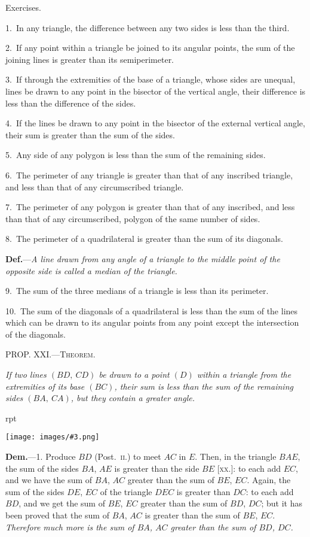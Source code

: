 \documentclass[oneside]{book}
\newcounter{wrapwidth}
\newcommand\mypropl[2]{
\bigskip\Needspace*{4\baselineskip}\begin{center}\textsc{#1}\end{center}
\hspace{\parindent}\emph{#2}\par\medskip
}
\newcommand\exhead[1]{
\Needspace*{5\baselineskip}\begin{center}
\textsf{#1}
\end{center}
}
\newcommand\imgflow[3]{
\setcounter{wrapwidth}{#1}
\begin{wrapfigure}[#2]{r}{\value{wrapwidth}pt}
\begin{center}
\vspace{-0.3in}
\texttt{[image: images/\#3.png]}
\end{center}
\end{wrapfigure}
}
\begin{document}
\exhead{Exercises.}

\begin{footnotesize}
1.~In any triangle, the difference between any two sides is less
than the third.

2.~If any point within a triangle be joined to its angular points,
the sum of the joining lines is greater than its semiperimeter.

3.~If through the extremities of the base of a triangle, whose
sides are unequal, lines be drawn to any point in the bisector of
the vertical angle, their difference is less than the difference of
the sides.

4.~If the lines be drawn to any point in the bisector of the
external vertical angle, their sum is greater than the sum of the
sides.

5.~Any side of any polygon is less than the sum of the remaining
sides.

6.~The perimeter of any triangle is greater than that of any
inscribed triangle, and less than that of any circumscribed triangle.

7.~The perimeter of any polygon is greater than that of any
inscribed, and less than that of any circumscribed, polygon of the
same number of sides.

8.~The perimeter of a quadrilateral is greater than the sum of
its diagonals.

\textbf{Def.}---\emph{A line drawn from any angle of a triangle to the middle
point of the opposite side is called a median of the triangle.}

9.~The sum of the three medians of a triangle is less than its
perimeter.

10.~The sum of the diagonals of a quadrilateral is less than the
sum of the lines which can be drawn to its angular points from
any point except the intersection of the diagonals.
\par\end{footnotesize}


\mypropl{PROP\@. XXI\@.---Theorem.}{If two lines $(BD,\ CD)$ be drawn to a point $(D)$ within
a triangle from the extremities of its base $(BC)$, their sum
is less than the sum of the remaining sides $(BA,\ CA)$, but
they contain a greater angle.}

\imgflow{125}{8}{f037}

\textbf{Dem.}---1. Produce $BD$ (Post.~\textsc{ii}.) to meet $AC$ in $E$.
Then, in the triangle $BAE$, the
sum of the sides $BA$, $AE$ is
greater than the side $BE$ [\textsc{xx}.]:
to each add $EC$, and we have
the sum of $BA$, $AC$ greater
than the sum of $BE$, $EC$. Again,
the sum of the sides $DE$, $EC$ of
the triangle $DEC$ is greater
than $DC$: to each add $BD$, and
we get the sum of $BE$, $EC$ greater than the sum of $BD$,
$DC$; but it has been proved that the sum of $BA$, $AC$ is
greater than the sum of $BE$, $EC$. \emph{Therefore much
more is the sum of $BA$, $AC$ greater than the sum of
$BD$, $DC$.}
\end{document}
